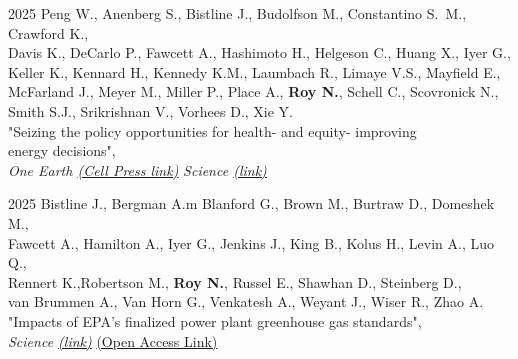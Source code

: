\documentclass[margin]{res}
\begin{document}
\begin{resume}
2025 \hspace{4mm}%
Peng W., Anenberg S., Bistline J., Budolfson M., Constantino S.~M., Crawford K., \\
\hspace*{11mm}  Davis K.,  DeCarlo P., Fawcett A., Hashimoto H., Helgeson C., Huang X., Iyer G., \\
\hspace*{11mm}  Keller K., Kennard H., Kennedy K.M., Laumbach R., Limaye V.S., Mayfield E., \\
\hspace*{11mm} McFarland J., Meyer M., Miller P., Place A., \textbf{Roy N.}, Schell C., Scovronick N.,  \\
\hspace*{11mm} Smith S.J., Srikrishnan V., Vorhees D., Xie Y. \\
\hspace*{16mm} "Seizing the policy opportunities for health- and equity- improving \\ \hspace*{16mm} energy decisions", \\
\hspace*{16mm} \textit{One Earth  
\href{https://www.cell.com/one-earth/abstract/S2590-3322(24)00601-8} {(Cell Press link)}}
\textit{Science \href{https://www.sciencedirect.com/science/article/abs/pii/S2590332224006018}{(link)}}

2025 \hspace{4mm}%
Bistline J., Bergman A.m Blanford G., Brown M., Burtraw D., Domeshek M.,  \\
\hspace*{11mm}  Fawcett A., Hamilton A., Iyer G., Jenkins J., King B., Kolus H., Levin A., Luo Q.,  \\
\hspace*{11mm}  Rennert K.,Robertson M., \textbf{Roy N.}, Russel E., Shawhan D., Steinberg D.,  \\
\hspace*{11mm} van Brummen A., Van Horn G., Venkatesh A., Weyant J., Wiser R.,  Zhao A. \\
\hspace*{16mm} "Impacts of EPA’s finalized power plant greenhouse gas standards", \\ \hspace*{16mm} \textit{Science  
\href{https://www.science.org/doi/10.1126/science.adt5665} {(link)} }
\href{https://arxiv.org/pdf/2501.05561} {(Open Access Link)} 


\end{resume}
\end{document}
